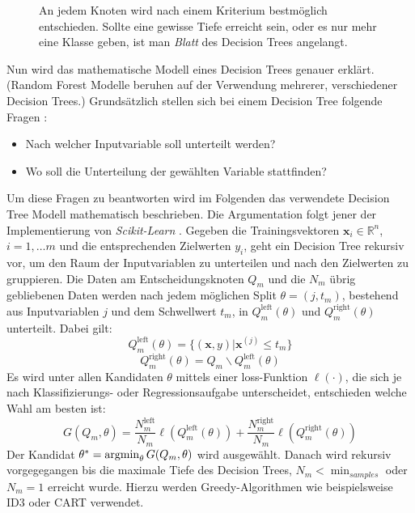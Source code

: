 \begin{figure}[ht]
  \label{fig:rf1}
  \begin{center}
    \begin{tiny}
    \end{tiny}
  \end{center}
  \caption[Schematische Darstellung eines Decision Tree Modells]
    {An jedem Knoten wird nach einem Kriterium bestm\"oglich entschieden. Sollte eine gewisse Tiefe erreicht sein, 
    oder es nur mehr eine Klasse geben, ist man \textit{Blatt} des Decision Trees angelangt.}
\end{figure}



Nun wird das mathematische Modell eines Decision Trees genauer erkl\"art. (Random Forest Modelle beruhen auf der Verwendung mehrerer, verschiedener Decision Trees.)
Grunds\"atzlich stellen sich bei einem Decision Tree folgende Fragen \cite{shalev}:
\begin{itemize}
  \item Nach welcher Inputvariable soll unterteilt werden?
  \item Wo soll die Unterteilung der gew\"ahlten Variable stattfinden?
\end{itemize}

Um diese Fragen zu beantworten wird im Folgenden das verwendete Decision Tree Modell mathematisch beschrieben. Die Argumentation folgt jener der Implementierung von \textit{Scikit-Learn} \cite{sklearn}.
Gegeben die Trainingsvektoren $\mathbf{x}_i \in \mathbb{R}^n$, $i=1,\dots m$ und die entsprechenden Zielwerten $y_i$, geht ein Decision Tree rekursiv vor, um den 
Raum der Inputvariablen zu unterteilen und nach den Zielwerten zu gruppieren. Die Daten am Entscheidungsknoten $Q_m$ und die $N_m$ \"ubrig 
gebliebenen Daten werden nach jedem m\"oglichen 
Split $\theta = (j, t_m)$, bestehend aus Inputvariablen $j$ und dem Schwellwert $t_m$, in $Q_m^{\text{left}}(\theta)$ und $Q_m^{\text{right}}(\theta)$ unterteilt. Dabei gilt:
$$ Q_m^{\text{left}}(\theta) = \{ (\mathbf{x},y) | \mathbf{x}^{(j)} \leq t_m \} $$
$$ Q_m^{\text{right}}(\theta) = Q_m \backslash Q_m^{\text{left}}(\theta) $$
Es wird unter allen Kandidaten $\theta$ mittels einer loss-Funktion $\ell(\cdot)$, die sich je nach Klassifizierungs- oder Regressionsaufgabe unterscheidet, entschieden
welche Wahl am besten ist:
$$ G(Q_m, \theta) = \frac{N_m^{\text{left}}}{N_m}\ell(Q_m^{\text{left}}(\theta)) + \frac{N_m^{\text{right}}}{N_m}\ell(Q_m^{\text{right}}(\theta)) $$ 
Der Kandidat $\theta^* = \operatorname*{argmin}_{\theta}G(Q_m, \theta)$ wird ausgew\"ahlt. Danach wird rekursiv vorgegegangen bis die maximale Tiefe des Decision Trees, 
$N_m < \operatorname{min}_{samples}$ oder $N_m = 1$ erreicht wurde. Hierzu werden Greedy-Algorithmen wie beispielsweise ID3 \cite{ID3} oder CART \cite{breiman1984classification} verwendet.\\


